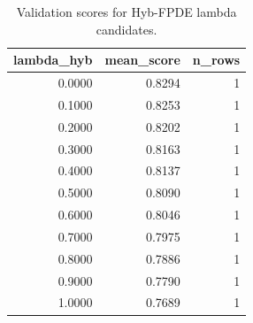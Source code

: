 \begin{table}[t]
\caption{Validation scores for Hyb-FPDE lambda candidates.}
\label{tab:lambda_distribution_computed}
\centering
\begin{tabular}{rrr}
\toprule
lambda\_hyb & mean\_score & n\_rows \\
\midrule
0.0000 & 0.8294 & 1 \\
0.1000 & 0.8253 & 1 \\
0.2000 & 0.8202 & 1 \\
0.3000 & 0.8163 & 1 \\
0.4000 & 0.8137 & 1 \\
0.5000 & 0.8090 & 1 \\
0.6000 & 0.8046 & 1 \\
0.7000 & 0.7975 & 1 \\
0.8000 & 0.7886 & 1 \\
0.9000 & 0.7790 & 1 \\
1.0000 & 0.7689 & 1 \\
\bottomrule
\end{tabular}

\end{table}
